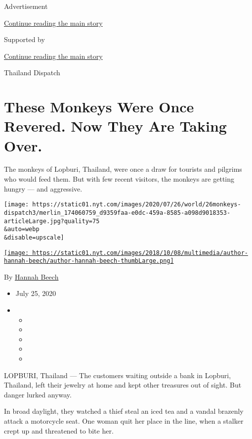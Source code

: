 Advertisement

\protect\hyperlink{after-top}{Continue reading the main story}

Supported by

\protect\hyperlink{after-sponsor}{Continue reading the main story}

Thailand Dispatch

\hypertarget{these-monkeys-were-once-revered-now-they-are-taking-over}{%
\section{These Monkeys Were Once Revered. Now They Are Taking
Over.}\label{these-monkeys-were-once-revered-now-they-are-taking-over}}

The monkeys of Lopburi, Thailand, were once a draw for tourists and
pilgrims who would feed them. But with few recent visitors, the monkeys
are getting hungry --- and aggressive.

\texttt{[image: https://static01.nyt.com/images/2020/07/26/world/26monkeys-dispatch3/merlin\_174060759\_d9359faa-e0dc-459a-8585-a098d9018353-articleLarge.jpg?quality=75\\\&auto=webp\\\&disable=upscale]}

\href{https://www.nytimes.com/by/hannah-beech}{\texttt{[image: https://static01.nyt.com/images/2018/10/08/multimedia/author-hannah-beech/author-hannah-beech-thumbLarge.png]}}

By \href{https://www.nytimes.com/by/hannah-beech}{Hannah Beech}

\begin{itemize}
\item
  July 25, 2020
\item
  \begin{itemize}
  \item
  \item
  \item
  \item
  \item
  \end{itemize}
\end{itemize}

LOPBURI, Thailand --- The customers waiting outside a bank in Lopburi,
Thailand, left their jewelry at home and kept other treasures out of
sight. But danger lurked anyway.

In broad daylight, they watched a thief steal an iced tea and a vandal
brazenly attack a motorcycle seat. One woman quit her place in the line,
when a stalker crept up and threatened to bite her.

